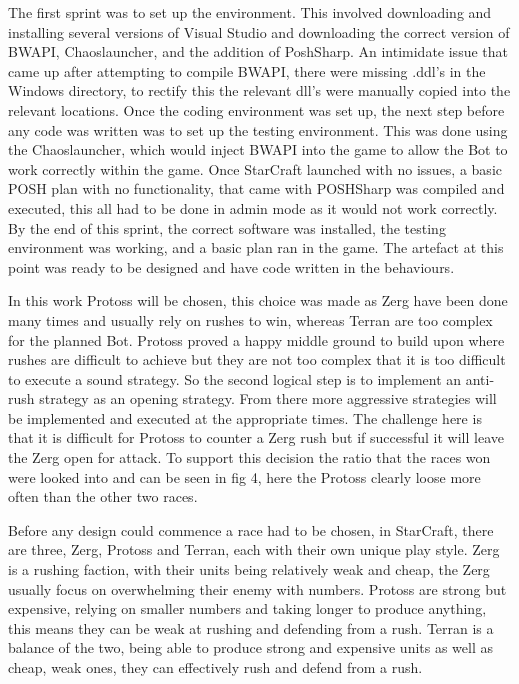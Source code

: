 \documentclass[journal]{IEEEtran}
\begin{document}
	The first sprint was to set up the environment. This involved downloading and installing several versions of Visual Studio and downloading the correct version of BWAPI, Chaoslauncher, and the addition of PoshSharp. An intimidate issue that came up after attempting to compile BWAPI, there were missing .ddl's in the Windows directory, to rectify this the relevant dll's were manually copied into the relevant locations. Once the coding environment was set up, the next step before any code was written was to set up the testing environment. This was done using the Chaoslauncher, which would inject BWAPI into the game to allow the Bot to work correctly within the game. Once StarCraft launched with no issues, a basic POSH plan with no functionality, that came with POSHSharp was compiled and executed, this all had to be done in admin mode as it would not work correctly. By the end of this sprint, the correct software was installed, the testing environment was working, and a basic plan ran in the game. The artefact at this point was ready to be designed and have code written in the behaviours.
	
	In this work Protoss will be chosen, this choice was made as Zerg have been done many times and usually rely on rushes to win, whereas Terran are too complex for the planned Bot. Protoss proved a happy middle ground to build upon where rushes are difficult to achieve but they are not too complex that it is too difficult to execute a sound strategy. So the second logical step is to implement an anti-rush strategy as an opening strategy. From there more aggressive strategies will be implemented and executed at the appropriate times. The challenge here is that it is difficult for Protoss to counter a Zerg rush but if successful it will leave the Zerg open for attack. To support this decision the ratio that the races won were looked into and can be seen in fig 4, here the Protoss clearly loose more often than the other two races.
	
	Before any design could commence a race had to be chosen, in StarCraft, there are three, Zerg, Protoss and Terran, each with their own unique play style. Zerg is a rushing faction, with their units being relatively weak and cheap, the Zerg usually focus on overwhelming their enemy with numbers. Protoss are strong but expensive, relying on smaller numbers and taking longer to produce anything, this means they can be weak at rushing and defending from a rush. Terran is a balance of the two, being able to produce strong and expensive units as well as cheap, weak ones, they can effectively rush and defend from a rush.
	
\end{document}
